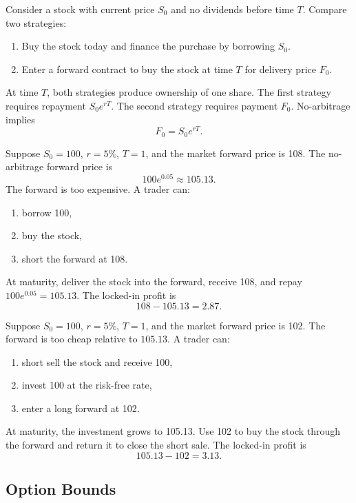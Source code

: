 Consider a stock with current price $S_0$ and no dividends before time $T$.
Compare two strategies:
\begin{enumerate}
    \item Buy the stock today and finance the purchase by borrowing $S_0$.
    \item Enter a forward contract to buy the stock at time $T$ for delivery
    price $F_0$.
\end{enumerate}
At time $T$, both strategies produce ownership of one share. The first strategy
requires repayment $S_0e^{rT}$. The second strategy requires payment $F_0$.
No-arbitrage implies
\[
    F_0 = S_0e^{rT}.
\]

\begin{exmp}
Suppose $S_0=100$, $r=5\%$, $T=1$, and the market forward price is 108. The
no-arbitrage forward price is
\[
    100e^{0.05}\approx 105.13.
\]
The forward is too expensive. A trader can:
\begin{enumerate}
    \item borrow 100,
    \item buy the stock,
    \item short the forward at 108.
\end{enumerate}
At maturity, deliver the stock into the forward, receive 108, and repay
$100e^{0.05}=105.13$. The locked-in profit is
\[
    108-105.13=2.87.
\]
\end{exmp}

\begin{exmp}
Suppose $S_0=100$, $r=5\%$, $T=1$, and the market forward price is 102. The
forward is too cheap relative to $105.13$. A trader can:
\begin{enumerate}
    \item short sell the stock and receive 100,
    \item invest 100 at the risk-free rate,
    \item enter a long forward at 102.
\end{enumerate}
At maturity, the investment grows to 105.13. Use 102 to buy the stock through the
forward and return it to close the short sale. The locked-in profit is
\[
    105.13-102=3.13.
\]
\end{exmp}

\subsection{Option Bounds}

